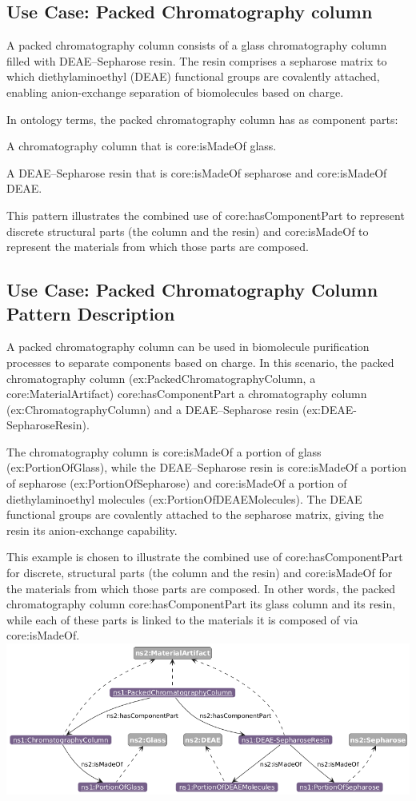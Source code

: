 \subsection*{Use Case: Packed Chromatography column}
A packed chromatography column consists of a glass chromatography column filled with DEAE–Sepharose resin. The resin comprises a sepharose matrix to which diethylaminoethyl (DEAE) functional groups are covalently attached, enabling anion-exchange separation of biomolecules based on charge.

In ontology terms, the packed chromatography column has as component parts:

A chromatography column that is core:isMadeOf glass.

A DEAE–Sepharose resin that is core:isMadeOf sepharose and core:isMadeOf DEAE.

This pattern illustrates the combined use of core:hasComponentPart to represent discrete structural parts (the column and the resin) and core:isMadeOf to represent the materials from which those parts are composed.

\subsection*{Use Case: Packed Chromatography Column Pattern Description}

A packed chromatography column can be used in biomolecule purification processes to separate components based on charge. In this scenario, the packed chromatography column (ex:PackedChromatographyColumn, a core:MaterialArtifact) core:hasComponentPart a chromatography column (ex:ChromatographyColumn) and a DEAE–Sepharose resin (ex:DEAE-SepharoseResin).

The chromatography column is core:isMadeOf a portion of glass (ex:PortionOfGlass), while the DEAE–Sepharose resin is core:isMadeOf a portion of sepharose (ex:PortionOfSepharose) and core:isMadeOf a portion of diethylaminoethyl molecules (ex:PortionOfDEAEMolecules). The DEAE functional groups are covalently attached to the sepharose matrix, giving the resin its anion-exchange capability.

This example is chosen to illustrate the combined use of core:hasComponentPart for discrete, structural parts (the column and the resin) and core:isMadeOf for the materials from which those parts are composed. In other words, the packed chromatography column core:hasComponentPart its glass column and its resin, while each of these parts is linked to the materials it is composed of via core:isMadeOf.
\includegraphics[scale=0.5]{scenarios/object-artifact-material/image/chrome.png}

